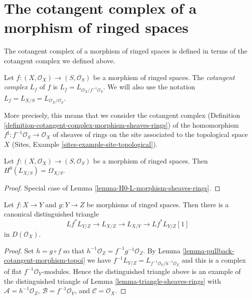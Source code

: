 \section{The cotangent complex of a morphism of ringed spaces}
\label{section-cotangent-morphism-ringed-spaces}

\noindent
The cotangent complex of a morphism of ringed spaces is defined
in terms of the cotangent complex we defined above.

\begin{definition}
\label{definition-cotangent-complex-morphism-ringed-spaces}
Let $f : (X, \mathcal{O}_X) \to (S, \mathcal{O}_S)$ be a morphism of
ringed spaces. The {\it cotangent complex} $L_f$ of $f$ is
$L_f = L_{\mathcal{O}_X/f^{-1}\mathcal{O}_S}$.
We will also use the notation
$L_f = L_{X/S} = L_{\mathcal{O}_X/\mathcal{O}_S}$.
\end{definition}

\noindent
More precisely, this means that we consider the cotangent complex
(Definition \ref{definition-cotangent-complex-morphism-sheaves-rings})
of the homomorphism $f^\sharp : f^{-1}\mathcal{O}_S \to \mathcal{O}_X$
of sheaves of rings on the site associated to the topological space $X$
(Sites, Example \ref{sites-example-site-topological}).

\begin{lemma}
\label{lemma-H0-L-morphism-ringed-spaces}
Let $f : (X, \mathcal{O}_X) \to (S, \mathcal{O}_S)$ be a morphism of
ringed spaces. Then $H^0(L_{X/S}) = \Omega_{X/S}$.
\end{lemma}

\begin{proof}
Special case of Lemma \ref{lemma-H0-L-morphism-sheaves-rings}.
\end{proof}

\begin{lemma}
\label{lemma-triangle-ringed-spaces}
Let $f : X \to Y$ and $g : Y \to Z$ be morphisms of ringed spaces.
Then there is a canonical distinguished triangle
$$
Lf^* L_{Y/Z} \to L_{X/Z} \to L_{X/Y} \to Lf^*L_{Y/Z}[1]
$$
in $D(\mathcal{O}_X)$.
\end{lemma}

\begin{proof}
Set $h = g \circ f$ so that $h^{-1}\mathcal{O}_Z = f^{-1}g^{-1}\mathcal{O}_Z$.
By Lemma \ref{lemma-pullback-cotangent-morphism-topoi} we have
$f^{-1}L_{Y/Z} = L_{f^{-1}\mathcal{O}_Y/h^{-1}\mathcal{O}_Z}$
and this is a complex of flat $f^{-1}\mathcal{O}_Y$-modules.
Hence the distinguished triangle above is an example of the
distinguished triangle of
Lemma \ref{lemma-triangle-sheaves-rings}
with $\mathcal{A} = h^{-1}\mathcal{O}_Z$, $\mathcal{B} = f^{-1}\mathcal{O}_Y$,
and $\mathcal{C} = \mathcal{O}_X$.
\end{proof}

